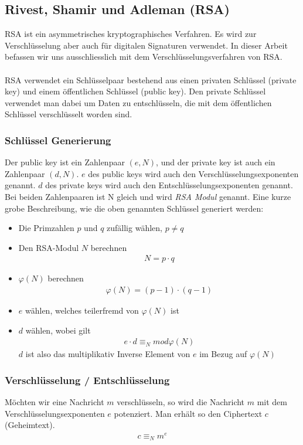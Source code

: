 \documentclass[paper=a4,fontsize=12pt]{scrartcl}
\begin{document}
\subsection{Rivest, Shamir und Adleman (RSA)} \label{RSA-intro}
RSA ist ein asymmetrisches kryptographisches Verfahren. Es wird zur Verschlüsselung aber auch für digitalen Signaturen verwendet.
In dieser Arbeit befassen wir uns ausschliesslich mit dem Verschlüsselungsverfahren von RSA.
\\ \\
RSA verwendet ein Schlüsselpaar bestehend aus einen privaten Schlüssel (private key) und einem öffentlichen Schlüssel  (public key).
Den private Schlüssel verwendet man dabei um Daten zu entschlüsseln, die mit dem öffentlichen Schlüssel verschlüsselt worden sind. 

\subsubsection{Schlüssel Generierung}
Der public key ist ein Zahlenpaar $(e,N)$, und der private key ist auch ein Zahlenpaar $(d,N)$.
$e$ des public keys wird auch den Verschlüsselungsexponenten genannt.
$d$ des private keys wird auch den Entschlüsselungsexponenten genannt. 
Bei beiden Zahlenpaaren ist N gleich und wird \textit{RSA Modul} genannt.
Eine kurze grobe Beschreibung, wie die oben genannten Schlüssel generiert werden:
\begin{itemize}
  \item Die Primzahlen $p$ und $q$ zufällig wählen, $p \neq q$
  \item Den RSA-Modul $N$ berechnen \begin{align} N = p \cdot q \end{align}
  \item $\varphi(N)$ berechnen \begin{align} \varphi(N) = (p-1) \cdot (q-1)\end{align}
  \item $e$ wählen, welches teilerfremd von $\varphi(N)$ ist
  \item $d$ wählen, wobei gilt \begin{align} e \cdot d \equiv_N mod \varphi(N)\end{align} $d$ ist also das multiplikativ Inverse Element von $e$ im Bezug auf $\varphi(N)$
\end{itemize}

\subsubsection{Verschlüsselung / Entschlüsselung}
Möchten wir eine Nachricht $m$ verschlüsseln, so wird die Nachricht $m$ mit dem Verschlüsselungsexponenten $e$ potenziert.
Man erhält so den Ciphertext $c$ (Geheimtext).
\begin{align}
	c \equiv_N m^e
\end{align}
\end{document}
